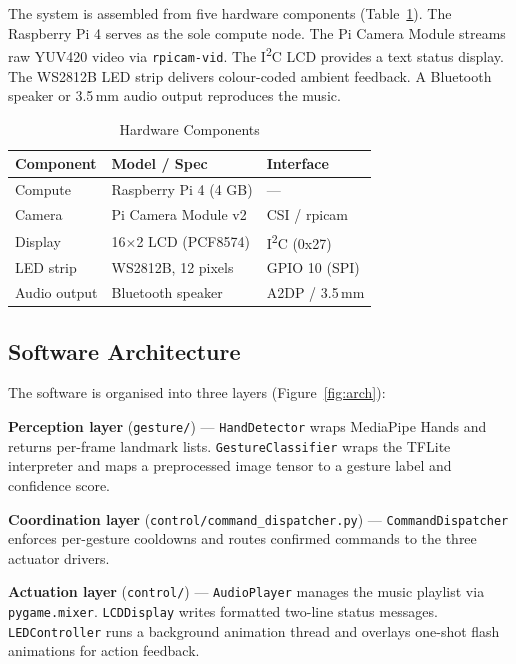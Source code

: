 \documentclass[sigconf, nonacm]{acmart}
\begin{document}
The system is assembled from five hardware components (Table~\ref{tab:hardware}). The Raspberry Pi 4 serves as the sole compute node. The Pi Camera Module streams raw YUV420 video via \texttt{rpicam-vid}. The I\textsuperscript{2}C LCD provides a text status display. The WS2812B LED strip delivers colour-coded ambient feedback. A Bluetooth speaker or 3.5\,mm audio output reproduces the music.

\begin{table}[h]
\centering
\caption{Hardware Components}
\label{tab:hardware}
\begin{tabular}{lll}
\toprule
\textbf{Component} & \textbf{Model / Spec} & \textbf{Interface} \\
\midrule
Compute          & Raspberry Pi 4 (4 GB) & —          \\
Camera           & Pi Camera Module v2   & CSI / rpicam \\
Display          & 16$\times$2 LCD (PCF8574) & I\textsuperscript{2}C (0x27) \\
LED strip        & WS2812B, 12 pixels    & GPIO 10 (SPI) \\
Audio output     & Bluetooth speaker     & A2DP / 3.5\,mm \\
\bottomrule
\end{tabular}
\end{table}

\subsection{Software Architecture}

The software is organised into three layers (Figure~\ref{fig:arch}):

\textbf{Perception layer} (\texttt{gesture/}) — \texttt{HandDetector} wraps MediaPipe Hands and returns per-frame landmark lists. \texttt{GestureClassifier} wraps the TFLite interpreter and maps a preprocessed image tensor to a gesture label and confidence score.

\textbf{Coordination layer} (\texttt{control/command\_dispatcher.py}) — \texttt{CommandDispatcher} enforces per-gesture cooldowns and routes confirmed commands to the three actuator drivers.

\textbf{Actuation layer} (\texttt{control/}) — \texttt{AudioPlayer} manages the music playlist via \texttt{pygame.mixer}. \texttt{LCDDisplay} writes formatted two-line status messages. \texttt{LEDController} runs a background animation thread and overlays one-shot flash animations for action feedback.
\end{document}
